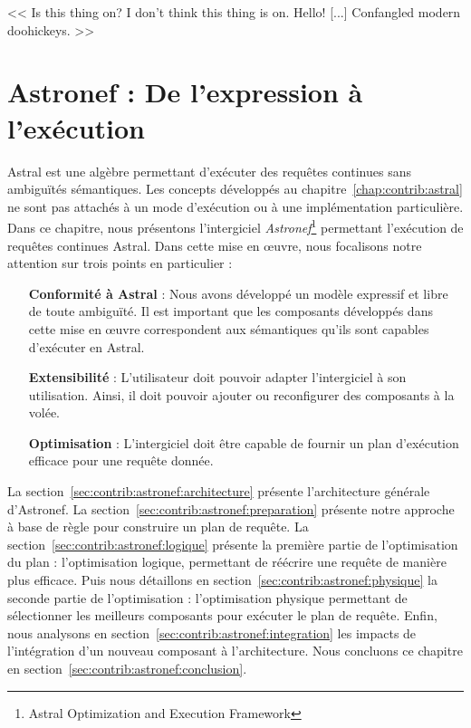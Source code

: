 \begin{savequote}[6cm]
<< Is this thing on? I don't think this thing is on. Hello! [...] Confangled modern doohickeys. >>
\end{savequote}

\chapter{Astronef : De l'expression à l'exécution}\label{chap:contrib:astronef}
\chaptertoc

Astral est une algèbre permettant d'exécuter des requêtes continues sans ambiguïtés sémantiques. Les concepts développés au chapitre~\ref{chap:contrib:astral} ne sont pas attachés à un mode d'exécution ou à une implémentation particulière. Dans ce chapitre, nous présentons l'intergiciel \textit{Astronef}\footnote{Astral Optimization and Execution Framework} permettant l'exécution de requêtes continues Astral. Dans cette mise en œuvre, nous focalisons notre attention sur trois points en particulier :
\begin{itemize}
	\item[\textbf{Conformité à Astral}] : Nous avons développé un modèle expressif et libre de toute ambiguïté. Il est important que les composants développés dans cette mise en œuvre correspondent aux sémantiques qu'ils sont capables d'exécuter en Astral.
	\item[\textbf{Extensibilité}] : L'utilisateur doit pouvoir adapter l'intergiciel à son utilisation. Ainsi, il doit pouvoir ajouter ou reconfigurer des composants à la volée.
	\item[\textbf{Optimisation}] : L'intergiciel doit être capable de fournir un plan d'exécution efficace pour une requête donnée.
\end{itemize}

La section~\ref{sec:contrib:astronef:architecture} présente l'architecture générale d'Astronef. La section~\ref{sec:contrib:astronef:preparation} présente notre approche à base de règle pour construire un plan de requête. La section~\ref{sec:contrib:astronef:logique} présente la première partie de l'optimisation du plan : l'optimisation logique, permettant de réécrire une requête de manière plus efficace. Puis nous détaillons en section~\ref{sec:contrib:astronef:physique} la seconde partie de l'optimisation : l'optimisation physique permettant de sélectionner les meilleurs composants pour exécuter le plan de requête. Enfin, nous analysons en section~\ref{sec:contrib:astronef:integration} les impacts de l'intégration d'un nouveau composant à l'architecture. Nous concluons ce chapitre en section~\ref{sec:contrib:astronef:conclusion}.

\lstset{language=PrologAstral}






